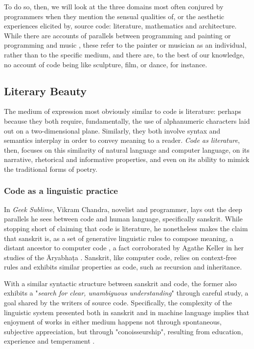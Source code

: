 To do so, then, we will look at the three domains most often conjured by programmers when they mention the sensual qualities of, or the aesthetic experiences elicited by, source code: literature, mathematics and architecture. While there are accounts of parallels between programming and painting \citep{graham_hackers_2003} or programming and music \citep{mclean_hacking_2004}, these refer to the painter or musician as an individual, rather than to the specific medium, and there are, to the best of our knowledge, no account of code being like sculpture, film, or dance, for instance.

\subsection{Literary Beauty}
\label{subsec:literary-beauty}

The medium of expression most obviously similar to code is literature: perhaps because they both require, fundamentally, the use of alphanumeric characters laid out on a two-dimensional plane. Similarly, they both involve syntax and semantics interplay in order to convey meaning to a reader. \emph{Code as literature}, then, focuses on this similarity of natural language and computer language, on its narrative, rhetorical and informative properties, and even on its ability to mimick the traditional forms of poetry.

\subsubsection{Code as a linguistic practice}
\label{subsubsec:code-linguistic}

In \emph{Geek Sublime}, Vikram Chandra, novelist and programmer, lays out the deep parallels he sees between code and human language, specifically sanskrit. While stopping short of claiming that code is literature, he nonetheless makes the claim that sanskrit is, as a set of generative linguistic rules to compose meaning, a distant ancestor to computer code \citep{chandra_geek_2014}, a fact corroborated by Agathe Keller in her studies of the Āryabhaṭa \citep{keller_textes_2021}. Sanskrit, like computer code, relies on context-free rules and exhibits similar properties as code, such as recursion and inheritance.

With a similar syntactic structure between sanskrit and code, the former also exhibits a "\emph{search for clear, unambiguous understanding}" through careful study, a goal shared by the writers of source code. Specifically, the complexity of the linguistic system presented both in sanskrit and in machine language implies that enjoyment of works in either medium happens not through spontaneous, subjective appreciation, but through "conoisseurship", resulting from education, experience and temperament \citep{chandra_geek_2014}.

